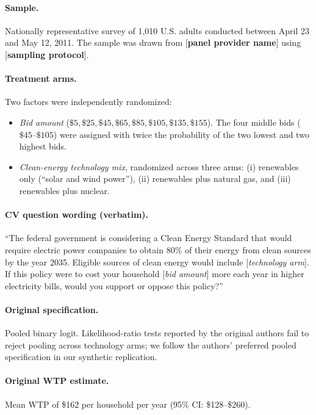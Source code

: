 \documentclass[12pt]{article}
\begin{document}
\paragraph{Sample.} Nationally representative survey of 1{,}010 U.S. adults conducted between April 23 and May 12, 2011. The sample was drawn from [\textbf{panel provider name}] using [\textbf{sampling protocol}].

\paragraph{Treatment arms.} Two factors were independently randomized:
\begin{itemize}[noitemsep]
    \item \textit{Bid amount} ($\$5, \$25, \$45, \$65, \$85, \$105, \$135, \$155$). The four middle bids ($\$45$--$\$105$) were assigned with twice the probability of the two lowest and two highest bids.
    \item \textit{Clean-energy technology mix}, randomized across three arms: (i) renewables only (``solar and wind power''), (ii) renewables plus natural gas, and (iii) renewables plus nuclear.
\end{itemize}

\paragraph{CV question wording (verbatim).} ``The federal government is considering a Clean Energy Standard that would require electric power companies to obtain 80\% of their energy from clean sources by the year 2035. Eligible sources of clean energy would include [\textit{technology arm}]. If this policy were to cost your household [\textit{bid amount}] more each year in higher electricity bills, would you support or oppose this policy?''

\paragraph{Original specification.} Pooled binary logit. Likelihood-ratio tests reported by the original authors fail to reject pooling across technology arms; we follow the authors' preferred pooled specification in our synthetic replication.

\paragraph{Original WTP estimate.} Mean WTP of \$162 per household per year (95\% CI: \$128--\$260).
\end{document}

